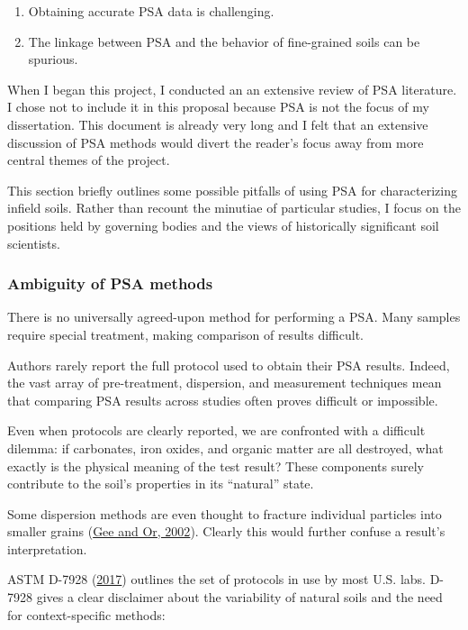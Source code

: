 \documentclass[
  letterpaper,
  openany]{book}
\providecommand{\tightlist}{%
  \setlength{\itemsep}{0pt}\setlength{\parskip}{0pt}}
\begin{document}
\begin{enumerate}
\def\labelenumi{\arabic{enumi}.}
\tightlist
\item
  Obtaining accurate PSA data is challenging.
\item
  The linkage between PSA and the behavior of fine-grained soils can be spurious.
\end{enumerate}

When I began this project, I conducted an an extensive review of PSA literature.
I chose not to include it in this proposal because PSA is not the focus of my dissertation.
This document is already very long and I felt that an extensive discussion of PSA methods would divert the reader's focus away from more central themes of the project.

This section briefly outlines some possible pitfalls of using PSA for characterizing infield soils.
Rather than recount the minutiae of particular studies, I focus on the positions held by governing bodies and the views of historically significant soil scientists.

\hypertarget{ambiguity-of-psa-methods}{%
\subsubsection{Ambiguity of PSA methods}\label{ambiguity-of-psa-methods}}

There is no universally agreed-upon method for performing a PSA. Many samples require special treatment, making comparison of results difficult.

Authors rarely report the full protocol used to obtain their PSA results.
Indeed, the vast array of pre-treatment, dispersion, and measurement techniques mean that comparing PSA results across studies often proves difficult or impossible.

Even when protocols are clearly reported, we are confronted with a difficult dilemma: if carbonates, iron oxides, and organic matter are all destroyed, what exactly is the physical meaning of the test result?
These components surely contribute to the soil's properties in its ``natural'' state.

Some dispersion methods are even thought to fracture individual particles into smaller grains (\protect\hyperlink{ref-Gee2002}{Gee and Or, 2002}).
Clearly this would further confuse a result's interpretation.

ASTM D-7928 (\protect\hyperlink{ref-ASTMD79282017}{2017}) outlines the set of protocols in use by most U.S. labs. D-7928 gives a clear disclaimer about the variability of natural soils and the need for context-specific methods:
\end{document}

